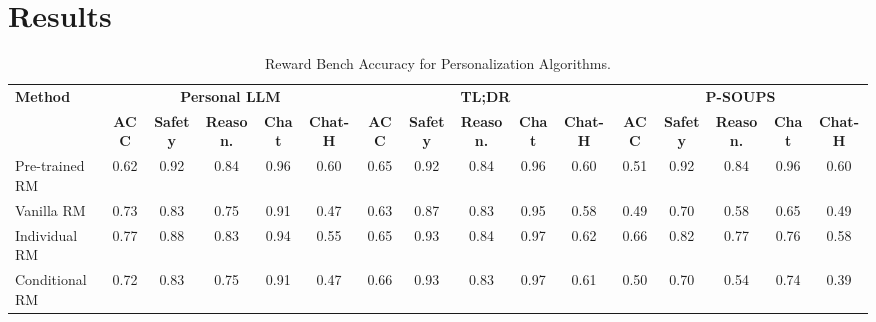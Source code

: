 \section{Results}
\begin{table*}[!h]
\setlength{\tabcolsep}{4pt}
\centering
\label{tab:sample_efficiency_ablation}
\tiny
\begin{tabular}{l|ccccc|ccccc|ccccc}
\toprule
\textbf{Method}                     & \multicolumn{5}{c|}{\textbf{Personal LLM}} & \multicolumn{5}{c|}{\textbf{TL;DR}} & \multicolumn{5}{c}{\textbf{P-SOUPS}} \\
                                    & \textbf{ACC} & \textbf{Safety} & \textbf{Reason.} & \textbf{Chat} & \textbf{Chat-H} & \textbf{ACC} & \textbf{Safety} & \textbf{Reason.} & \textbf{Chat} & \textbf{Chat-H} & \textbf{ACC} & \textbf{Safety} & \textbf{Reason.} & \textbf{Chat} & \textbf{Chat-H} \\
\midrule
Pre-trained RM                     &      0.62        &       0.92        &        0.84         &        0.96          &     0.60           &       0.65       &       0.92        &        0.84         &        0.96          &     0.60         &     0.51          &       0.92        &        0.84         &        0.96          &     0.60                     \\ \midrule
Vanilla RM                       &    0.73           &     0.83          &      0.75           &       0.91           &         0.47         &       0.63       &     0.87         &       0.83         &        0.95        &      0.58          &    0.49          &    0.70          &      0.58          &      0.65          &        0.49        \\
Individual RM                      &      0.77        &      0.88       &      0.83         &      0.94          &     0.55           &      0.65        &         0.93     &      0.84          &     0.97           &     0.62           &      0.66        &     0.82        &       0.77        &       0.76       &     0.58         \\
Conditional RM                      &       0.72       &     0.83         &      0.75           &       0.91           &        0.47          &      0.66        &     0.93           &      0.83          &       0.97         &       0.61       &        0.50      &     0.70           &   0.54             &       0.74      &      0.39    \\
\bottomrule
\end{tabular}
\caption{Reward Bench Accuracy for Personalization Algorithms. }
\label{reward_bench}
\end{table*}



